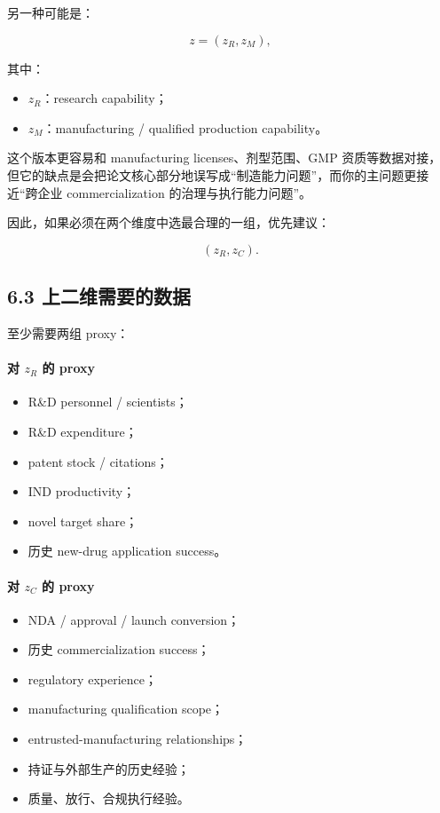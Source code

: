 \documentclass[12pt,fontset=none]{ctexart}
\begin{document}
另一种可能是：

\[
z=(z_R,z_M),
\]

其中：

\begin{itemize}[leftmargin=2em]
    \item \(z_R\)：research capability；
    \item \(z_M\)：manufacturing / qualified production capability。
\end{itemize}

这个版本更容易和 manufacturing licenses、剂型范围、GMP 资质等数据对接，
但它的缺点是会把论文核心部分地误写成“制造能力问题”，而你的主问题更接近“跨企业 commercialization 的治理与执行能力问题”。

因此，如果必须在两个维度中选最合理的一组，优先建议：

\[
(z_R,z_C).
\]

\subsection{6.3 上二维需要的数据}

至少需要两组 proxy：

\paragraph{对 \(z_R\) 的 proxy}
\begin{itemize}[leftmargin=2em]
    \item R\&D personnel / scientists；
    \item R\&D expenditure；
    \item patent stock / citations；
    \item IND productivity；
    \item novel target share；
    \item 历史 new-drug application success。
\end{itemize}

\paragraph{对 \(z_C\) 的 proxy}
\begin{itemize}[leftmargin=2em]
    \item NDA / approval / launch conversion；
    \item 历史 commercialization success；
    \item regulatory experience；
    \item manufacturing qualification scope；
    \item entrusted-manufacturing relationships；
    \item 持证与外部生产的历史经验；
    \item 质量、放行、合规执行经验。
\end{itemize}
\end{document}
